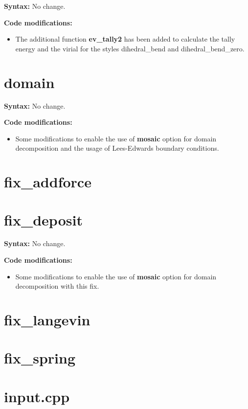 {\bfseries Syntax:} No change.
\vspace{0.2cm}

{\bfseries Code modifications:}
\begin{itemize}
\item The additional function \textbf{ev\_tally2} has been added to calculate the tally energy and the virial for the styles dihedral\_bend and dihedral\_bend\_zero.
\end{itemize}  

\section{domain}

{\bfseries Syntax:} No change.
\vspace{0.2cm}

{\bfseries Code modifications:}
\begin{itemize}
\item Some modifications to enable the use of \textbf{mosaic} option for domain decomposition and the usage of Lees-Edwards boundary conditions. 
\end{itemize}

\section{fix\_addforce}


\section{fix\_deposit}

{\bfseries Syntax:} No change.
\vspace{0.2cm}

{\bfseries Code modifications:}
\begin{itemize}
\item Some modifications to enable the use of \textbf{mosaic} option for domain decomposition with this fix.  
\end{itemize}

\section{fix\_langevin}


\section{fix\_spring}


\section{input.cpp}

